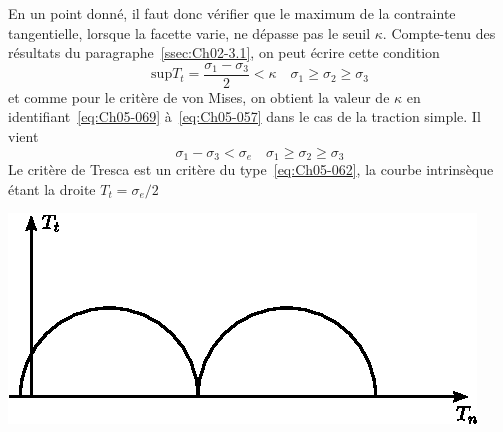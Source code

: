 En un point donné, il faut donc vérifier que le maximum de la contrainte tangentielle, lorsque la facette varie, ne dépasse pas le seuil $\kappa$. 
Compte-tenu des résultats du paragraphe~\ref{ssec:Ch02-3.1}, on peut écrire cette condition 
\begin{equation}
    \mathrm{sup} T_t = \frac{\sigma_1 - \sigma_3}{2} < \kappa \quad \sigma_1 \geq \sigma_2 \geq \sigma_3
    \label{eq:Ch05-069}
\end{equation}
et comme pour le critère de von Mises, on obtient la valeur de $\kappa$ en identifiant~\eqref{eq:Ch05-069} à~\eqref{eq:Ch05-057} dans le cas de la traction simple.
Il vient 
\begin{equation}
    \sigma_1 - \sigma_3 < \sigma_e \quad \sigma_1 \geq \sigma_2 \geq \sigma_3
    \label{eq:Ch05-070}
\end{equation}
Le critère de Tresca est un critère du type~\eqref{eq:Ch05-062}, la courbe intrinsèque étant la droite $T_t = \sigma_e/2$ 
\begin{center}
    \includegraphics{../images/T1_Ch05-05}
\end{center}

